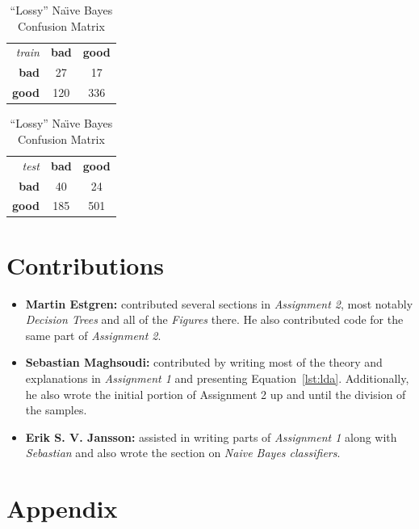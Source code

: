\documentclass[a4paper, twocolumn]{article}
\begin{document}
        \begin{table}[h]
        \begin{center}
        \begin{tabular}{r|c|c|}
            \multicolumn{1}{r}{\emph{train}}
            &\multicolumn{1}{c}{\textbf{bad}}
            &\multicolumn{1}{c}{\textbf{good}} \\
            \cline{2-3}
            \textbf{bad} & 27 & 17 \\
            \cline{2-3}
            \textbf{good} & 120 & 336 \\
            \cline{2-3}
        \end{tabular}
        \begin{tabular}{r|c|c|}
            \multicolumn{1}{r}{\emph{test}}
            &\multicolumn{1}{c}{\textbf{bad}}
            &\multicolumn{1}{c}{\textbf{good}} \\
            \cline{2-3}
            \textbf{bad} & 40 & 24 \\
            \cline{2-3}
            \textbf{good} & 185 & 501 \\
            \cline{2-3}
        \end{tabular}
        \end{center}
        \caption{``Lossy'' Na{\"\i}ve Bayes Confusion Matrix}
        \label{table:bayes10}
        \end{table}

        \section*{Contributions}
            \begin{itemize}
                \item{\textbf{Martin Estgren:} contributed several sections in \emph{Assignment 2}, most notably \emph{Decision Trees} and all of the \emph{Figures} there. He also contributed code for the same part of \emph{Assignment 2}.}
                \item{\textbf{Sebastian Maghsoudi:} contributed by writing most of the theory and explanations in \emph{Assignment 1} and presenting Equation~\ref{lst:lda}. Additionally, he also wrote the initial portion of Assignment 2 up and until the division of the samples.}
                \item{\textbf{Erik S. V. Jansson:} assisted in writing parts of \emph{Assignment 1} along with \emph{Sebastian} and also wrote the section on \emph{Naive Bayes classifiers}.}
            \end{itemize}

    \nocite{*} %
    
    
    \onecolumn \appendix
    \section*{Appendix}

    
    
    
\end{document}
